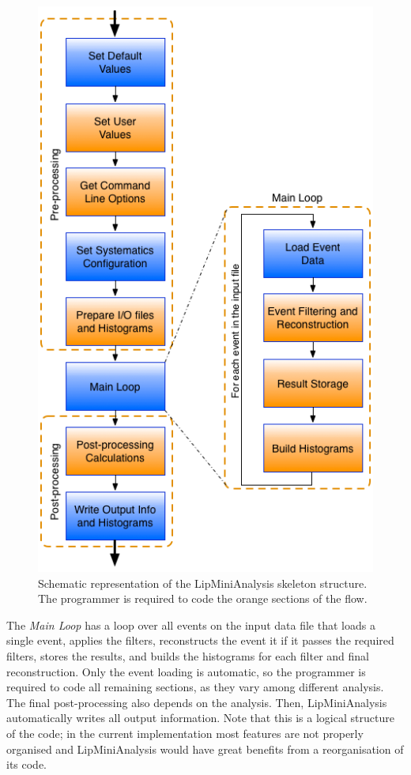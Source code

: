 \begin{figure}[!htp]
	\begin{center}
		\includegraphics[scale=0.5]{imgs/lipminianalysis.png}
		\caption{Schematic representation of the LipMiniAnalysis skeleton structure. The programmer is required to code the orange sections of the flow.}
		\label{fig:lipmini}
	\end{center}
\end{figure}

The \textit{Main Loop} has a loop over all events on the input data file that loads a single event, applies the filters, reconstructs the event it if it passes the required filters, stores the results, and builds the histograms for each filter and final reconstruction. Only the event loading is automatic, so the programmer is required to code all remaining sections, as they vary among different analysis. The final post-processing also depends on the analysis. Then, LipMiniAnalysis automatically writes all output information. Note that this is a logical structure of the code; in the current implementation most features are not properly organised and LipMiniAnalysis would have great benefits from a reorganisation of its code.

